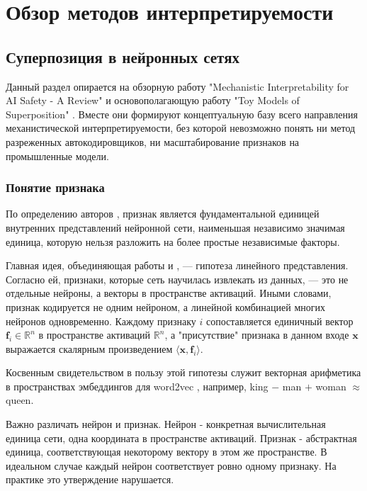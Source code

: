 \documentclass[a4paper,14pt]{extreport}
\begin{document}
\newpage

\chapter{Обзор методов интерпретируемости}

\section{Суперпозиция в нейронных сетях}

Данный раздел опирается на обзорную работу 
"Mechanistic Interpretability for AI Safety - A Review" \cite{bereska2024mechanistic} и основополагающую
работу "Toy Models of Superposition" \cite{elhage2022superposition}.
Вместе они формируют концептуальную базу всего направления механистической
интерпретируемости, без которой невозможно понять ни метод разреженных
автокодировщиков, ни масштабирование признаков на промышленные модели.

\subsection{Понятие признака}

По определению авторов \cite{bereska2024mechanistic},
признак является фундаментальной единицей внутренних представлений нейронной сети,
наименьшая независимо значимая единица, которую нельзя разложить на более
простые независимые факторы.

Главная идея, объединяющая работы \cite{elhage2022superposition} и
\cite{bereska2024mechanistic}, — гипотеза линейного представления. Согласно
ей, признаки, которые сеть научилась извлекать из данных, — это не отдельные
нейроны, а векторы в пространстве активаций. Иными словами, признак кодируется
не одним нейроном, а линейной комбинацией многих нейронов одновременно.
Каждому признаку $i$ сопоставляется единичный
вектор $\mathbf{f}_i \in \mathbb{R}^n$ в пространстве активаций $\mathbb{R}^n$,
а "присутствие" признака в данном входе $\mathbf{x}$ выражается скалярным
произведением $\langle \mathbf{x}, \mathbf{f}_i \rangle$.

Косвенным свидетельством в пользу этой гипотезы служит векторная арифметика 
в пространствах эмбеддингов для word2vec \cite{mikolov2013efficient}, например, king $-$ man $+$ woman $\approx$ queen.

Важно различать нейрон и признак. Нейрон - конкретная
вычислительная единица сети, одна координата в пространстве активаций. Признак -
абстрактная единица, соответствующая некоторому вектору в
этом же пространстве. В идеальном случае каждый нейрон соответствует ровно одному
признаку. На практике это утверждение нарушается.
\end{document}
